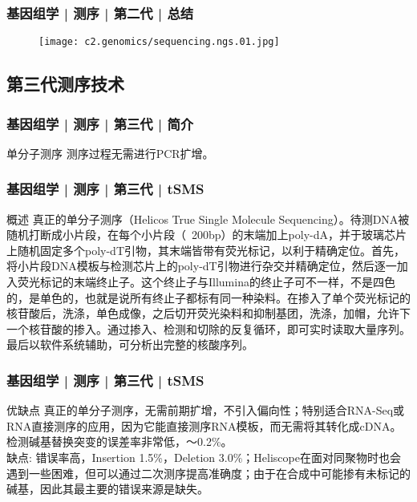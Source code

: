 

\begin{frame}
  \frametitle{基因组学 | 测序 | 第二代 | 总结}
  \begin{figure}
    \centering
    \texttt{[image: c2.genomics/sequencing.ngs.01.jpg]}
  \end{figure}
\end{frame}

\subsection{第三代测序技术}
\begin{frame}
  \frametitle{基因组学 | 测序 | 第三代 | 简介}
  \begin{block}{单分子测序}
测序过程无需进行PCR扩增。 
  \end{block}
\end{frame}

\begin{frame}
  \frametitle{基因组学 | 测序 | 第三代 | tSMS}
  \begin{block}{概述}
真正的单分子测序（Helicos True Single Molecule Sequencing）。待测DNA被随机打断成小片段，在每个小片段（~200bp）的末端加上poly-dA，并于玻璃芯片上随机固定多个poly-dT引物，其末端皆带有荧光标记，以利于精确定位。首先，将小片段DNA模板与检测芯片上的poly-dT引物进行杂交并精确定位，然后逐一加入荧光标记的末端终止子。这个终止子与Illumina的终止子可不一样，不是四色的，是单色的，也就是说所有终止子都标有同一种染料。在掺入了单个荧光标记的核苷酸后，洗涤，单色成像，之后切开荧光染料和抑制基团，洗涤，加帽，允许下一个核苷酸的掺入。通过掺入、检测和切除的反复循环，即可实时读取大量序列。最后以软件系统辅助，可分析出完整的核酸序列。
  \end{block}
\end{frame}

\begin{frame}
  \frametitle{基因组学 | 测序 | 第三代 | tSMS}
  \begin{block}{优缺点}
真正的单分子测序，无需前期扩增，不引入偏向性；特别适合RNA-Seq或RNA直接测序的应用，因为它能直接测序RNA模板，而无需将其转化成cDNA。检测碱基替换突变的误差率非常低，～0.2\%。\\
\vspace{1em}
缺点: 错误率高，Insertion 1.5\%，Deletion 3.0\%；Heliscope在面对同聚物时也会遇到一些困难，但可以通过二次测序提高准确度；由于在合成中可能掺有未标记的碱基，因此其最主要的错误来源是缺失。
  \end{block}
\end{frame}

